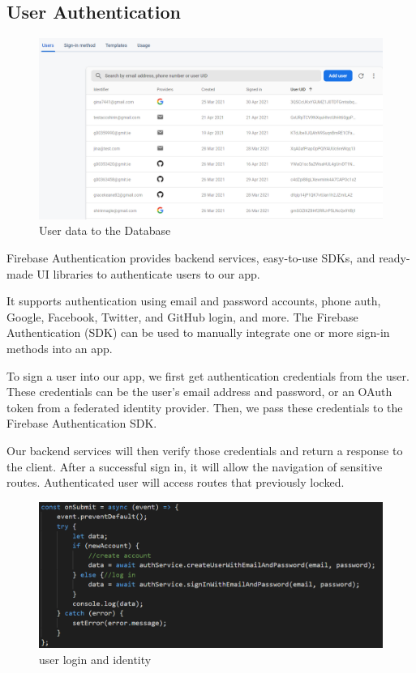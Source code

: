 \subsection{User Authentication}


\begin{figure}
    \centering
    \includegraphics[scale=0.5]{img/auth.PNG}
    \caption{User data to the Database}
    \label{fig:my_label4}
\end{figure}

Firebase Authentication provides backend services, easy-to-use SDKs, and ready-made UI libraries to authenticate users to our app.

It supports authentication using email and password accounts, phone auth, Google, Facebook, Twitter, and GitHub login, and more. The Firebase Authentication (SDK) can be used to manually integrate one or more sign-in methods into an app.

To sign a user into our app, we first get authentication credentials from the user. 
These credentials can be the user's email address and password, or an OAuth token from a federated identity provider. Then, we pass these credentials to the Firebase Authentication SDK. 

Our backend services will then verify those credentials and return a response to the client.
After a successful sign in, it will allow the navigation of sensitive routes.
Authenticated user will access routes that previously locked.

\begin{figure}
    \centering
    \includegraphics[scale=0.55]{img/login.PNG}
    \caption{user login and identity}
    \label{fig:my_label4}
\end{figure}


